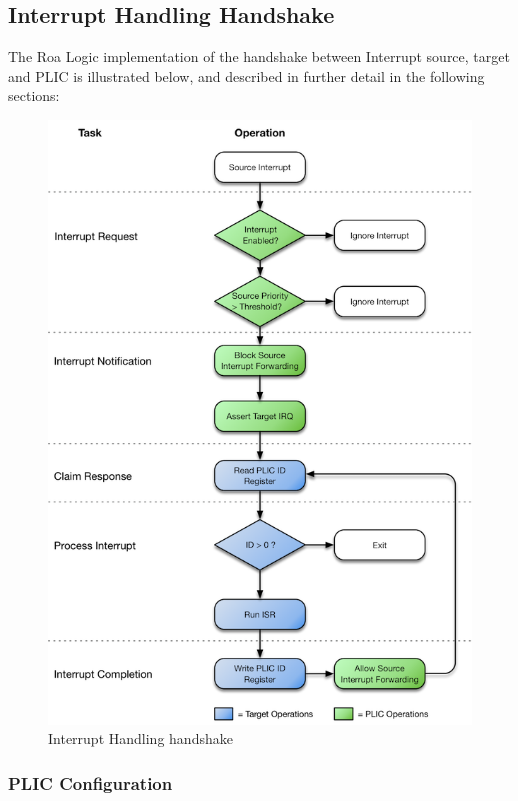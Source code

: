 \subsection{Interrupt Handling Handshake}

The Roa Logic implementation of the handshake between Interrupt source,
target and PLIC is illustrated below, and described in further detail in
the following sections:

\begin{figure}[h]

\includegraphics{../assets/graphics/AHB-Lite_PLIC_Handshake.png}
\caption{Interrupt Handling handshake}
\label{fig:HANDSHAKE}
\end{figure}

\subsubsection{PLIC Configuration}

